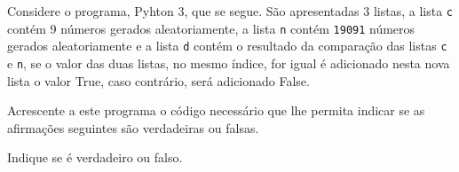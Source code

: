 \documentclass[12pt,varwidth=16cm,border=1pt]{standalone}
\begin{document}
Considere o programa, Pyhton 3, que se segue. São apresentadas 3 listas, a lista \verb+c+ contém 9 números gerados aleatoriamente, a lista \verb+n+ contém \verb+19091+ números gerados aleatoriamente e a lista \verb+d+ contém o resultado da comparação das listas \verb+c+ e \verb+n+, se o valor das duas listas, no mesmo índice, for igual é adicionado nesta nova lista o valor True, caso contrário, será adicionado False.


Acrescente a este programa o código necessário que lhe permita indicar se as
afirmações seguintes são verdadeiras ou falsas.

Indique se é verdadeiro ou falso.
\end{document}

